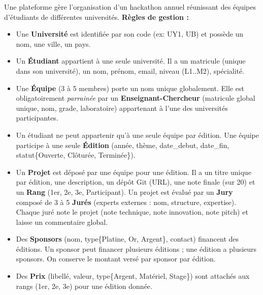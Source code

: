 \documentclass[11pt]{article}
\begin{document}
\begin{exercice}
Une plateforme gère l'organisation d'un hackathon annuel réunissant des équipes d'étudiants de différentes universités. 
\textbf{Règles de gestion :}
\begin{itemize}
    \item Une \textbf{Université} est identifiée par son code (ex: UY1, UB) et possède un nom, une ville, un pays.
    \item Un \textbf{Étudiant} appartient à une seule université. Il a un matricule (unique dans son université), un nom, prénom, email, niveau (L1..M2), spécialité.
    \item Une \textbf{Équipe} (3 à 5 membres) porte un nom unique globalement. Elle est obligatoirement \textit{parrainée} par un \textbf{Enseignant-Chercheur} (matricule global unique, nom, grade, laboratoire) appartenant à l'une des universités participantes.
    \item Un étudiant ne peut appartenir qu'à une seule équipe par édition. Une équipe participe à une seule \textbf{Édition} (année, thème, date\_debut, date\_fin, statut\{Ouverte, Clôturée, Terminée\}).
    \item Un \textbf{Projet} est déposé par une équipe pour une édition. Il a un titre unique par édition, une description, un dépôt Git (URL), une note finale (sur 20) et un \textbf{Rang} (1er, 2e, 3e, Participant). Un projet est évalué par un \textbf{Jury} composé de 3 à 5 \textbf{Jurés} (experts externes : nom, structure, expertise). Chaque juré note le projet (note technique, note innovation, note pitch) et laisse un commentaire global.
    \item Des \textbf{Sponsors} (nom, type\{Platine, Or, Argent\}, contact) financent des éditions. Un sponsor peut financer plusieurs éditions ; une édition a plusieurs sponsors. On conserve le montant versé par sponsor par édition.
    \item Des \textbf{Prix} (libellé, valeur, type\{Argent, Matériel, Stage\}) sont attachés aux rangs (1er, 2e, 3e) pour une édition donnée.
\end{itemize}


\end{exercice}
\end{document}
